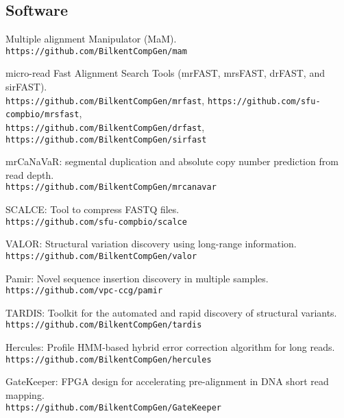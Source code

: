 \subsection{\small \sc Software}
\begin{list2}
\item
  Multiple alignment Manipulator (MaM).\\
  {\tt https://github.com/BilkentCompGen/mam}
\item
  micro-read Fast Alignment Search Tools (mrFAST, mrsFAST, drFAST, and sirFAST).\\
  {\tt https://github.com/BilkentCompGen/mrfast},
  {\tt https://github.com/sfu-compbio/mrsfast},\\
  {\tt https://github.com/BilkentCompGen/drfast},
  {\tt https://github.com/BilkentCompGen/sirfast}
\item
  mrCaNaVaR: segmental duplication and absolute copy number prediction from read depth.\\
  {\tt https://github.com/BilkentCompGen/mrcanavar}
\item
  SCALCE: Tool to compress FASTQ files. \\
  {\tt https://github.com/sfu-compbio/scalce}
\item
  VALOR: Structural variation discovery using long-range information. \\
  {\tt https://github.com/BilkentCompGen/valor}

\clearpage

\item
  Pamir: Novel sequence insertion discovery in multiple samples.\\
  {\tt https://github.com/vpc-ccg/pamir}
\item
  TARDIS: Toolkit for the automated and rapid discovery of structural variants.\\
  {\tt https://github.com/BilkentCompGen/tardis}
\item
  Hercules: Profile HMM-based hybrid error correction algorithm for long reads.\\
  {\tt https://github.com/BilkentCompGen/hercules}

\item
  GateKeeper: FPGA design for accelerating pre-alignment in DNA short read mapping.\\
  {\tt https://github.com/BilkentCompGen/GateKeeper}



\end{list2}
